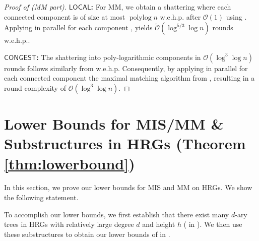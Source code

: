 \documentclass[letterpaper,11pt]{article}
\newcommand{\wehp}{w.e.h.p.\xspace}
\newcommand{\1}{\mathbb I}
\newcommand{\bigO}{\mathcal{O}}
\DeclareMathOperator{\polylog}{polylog}
\newcommand{\CONGEST}{\ensuremath{\mathsf{CONGEST}}\xspace}
\newcommand{\LOCAL}{\ensuremath{\mathsf{LOCAL}}\xspace}
\begin{document}
%
\begin{proof}[Proof of  (MM part)]
    \textbf{\LOCAL:} For MM, we obtain a shattering where each connected component is of size at most $\polylog n$ \wehp after $\bigO(1)$ using . Applying in parallel for each component \cite[Theorem 3.1]{GG24}, yields  $\tilde{\bigO}(\log^{5/3}\log n)$ rounds \wehp.

\smallskip

    \textbf{\CONGEST:} The shattering into poly-logarithmic components in  $\bigO(\log^3\log n)$ rounds follows similarly from  \wehp Consequently, by applying in parallel for each connected component the maximal matching algorithm from \cite[Theorem 1.2]{fischer2020improved}, resulting in a round complexity of $\bigO(\log^3\log n)$.
\end{proof}
%
\section{Lower Bounds for MIS/MM \& Substructures in HRGs (Theorem \ref{thm:lowerbound})}\label{sec:lower-bound}
In this section, we prove our lower bounds for MIS and MM on HRGs. We show the following statement.

\theoremlowerbound*

To accomplish our lower bounds, we first establish that there exist many $d$-ary trees in HRGs with relatively large degree $d$ and height $h$ ( in ). We then use these substructures to obtain our lower bounds of  in .
%
\end{document}
